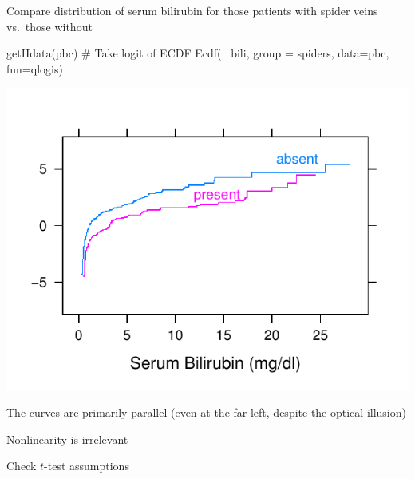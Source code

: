 \item Compare distribution of serum bilirubin for those patients with spider veins vs.\ those without
\begin{Schunk}
\begin{Sinput}
getHdata(pbc)
# Take logit of ECDF
Ecdf(~ bili, group = spiders, data=pbc, fun=qlogis)
\end{Sinput}


\centerline{\includegraphics[width=\maxwidth]{nonpar-pbc-1} }

\end{Schunk}

\item The curves are primarily parallel (even at the far left, despite the optical illusion)
\item Nonlinearity is irrelevant
\item Check $t$-test assumptions

